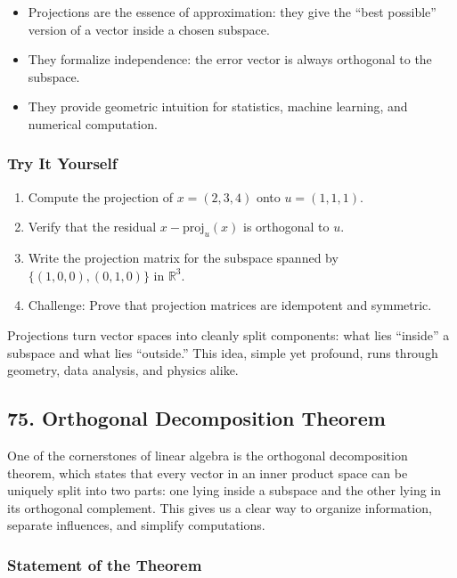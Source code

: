 \documentclass[
  letterpaper,
  DIV=11,
  numbers=noendperiod]{scrreprt}
\providecommand{\tightlist}{%
  \setlength{\itemsep}{0pt}\setlength{\parskip}{0pt}}
\begin{document}
\begin{itemize}
\tightlist
\item
  Projections are the essence of approximation: they give the ``best
  possible'' version of a vector inside a chosen subspace.
\item
  They formalize independence: the error vector is always orthogonal to
  the subspace.
\item
  They provide geometric intuition for statistics, machine learning, and
  numerical computation.
\end{itemize}

\subsubsection{Try It Yourself}\label{try-it-yourself-73}

\begin{enumerate}
\def\labelenumi{\arabic{enumi}.}
\tightlist
\item
  Compute the projection of \(x = (2,3,4)\) onto \(u = (1,1,1)\).
\item
  Verify that the residual \(x - \text{proj}_u(x)\) is orthogonal to
  \(u\).
\item
  Write the projection matrix for the subspace spanned by
  \(\{(1,0,0),(0,1,0)\}\) in \(\mathbb{R}^3\).
\item
  Challenge: Prove that projection matrices are idempotent and
  symmetric.
\end{enumerate}

Projections turn vector spaces into cleanly split components: what lies
``inside'' a subspace and what lies ``outside.'' This idea, simple yet
profound, runs through geometry, data analysis, and physics alike.

\subsection{75. Orthogonal Decomposition
Theorem}\label{orthogonal-decomposition-theorem}

One of the cornerstones of linear algebra is the orthogonal
decomposition theorem, which states that every vector in an inner
product space can be uniquely split into two parts: one lying inside a
subspace and the other lying in its orthogonal complement. This gives us
a clear way to organize information, separate influences, and simplify
computations.

\subsubsection{Statement of the
Theorem}\label{statement-of-the-theorem-1}
\end{document}
